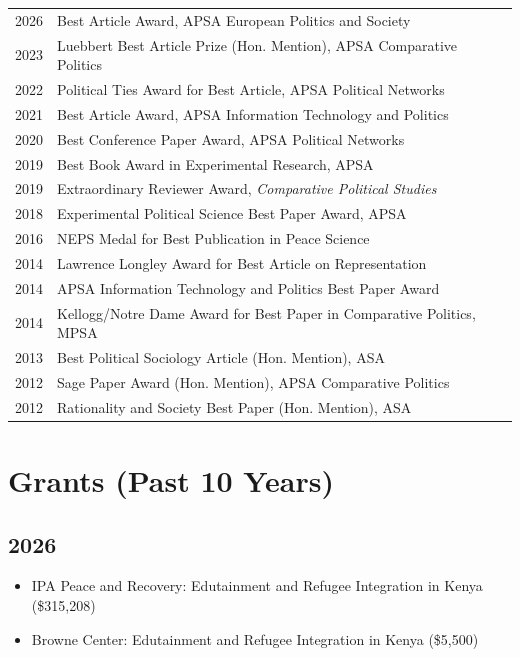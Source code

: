 \documentclass[10pt,a4paper]{article}
\begin{document}
\begin{tabular}{@{}p{} p{}@{}}
\textcolor{secondary}{2026} & Best Article Award, APSA European Politics and Society \\
\textcolor{secondary}{2023} & Luebbert Best Article Prize (Hon. Mention), APSA Comparative Politics \\
\textcolor{secondary}{2022} & Political Ties Award for Best Article, APSA Political Networks \\
\textcolor{secondary}{2021} & Best Article Award, APSA Information Technology and Politics \\
\textcolor{secondary}{2020} & Best Conference Paper Award, APSA Political Networks \\
\textcolor{secondary}{2019} & Best Book Award in Experimental Research, APSA \\
\textcolor{secondary}{2019} & Extraordinary Reviewer Award, \textit{Comparative Political Studies} \\
\textcolor{secondary}{2018} & Experimental Political Science Best Paper Award, APSA \\
\textcolor{secondary}{2016} & NEPS Medal for Best Publication in Peace Science \\
\textcolor{secondary}{2014} & Lawrence Longley Award for Best Article on Representation \\
\textcolor{secondary}{2014} & APSA Information Technology and Politics Best Paper Award \\
\textcolor{secondary}{2014} & Kellogg/Notre Dame Award for Best Paper in Comparative Politics, MPSA \\
\textcolor{secondary}{2013} & Best Political Sociology Article (Hon. Mention), ASA \\
\textcolor{secondary}{2012} & Sage Paper Award (Hon. Mention), APSA Comparative Politics \\
\textcolor{secondary}{2012} & Rationality and Society Best Paper (Hon. Mention), ASA \\
\end{tabular}

\section{Grants (Past 10 Years)}

\subsection*{2026}
\begin{itemize}[leftmargin=1em, itemsep=1pt, topsep=2pt, label=\textcolor{secondary}{$\bullet$}]
\item IPA Peace and Recovery: Edutainment and Refugee Integration in Kenya (\$315,208)
\item Browne Center: Edutainment and Refugee Integration in Kenya (\$5,500)
\end{itemize}
\end{document}
